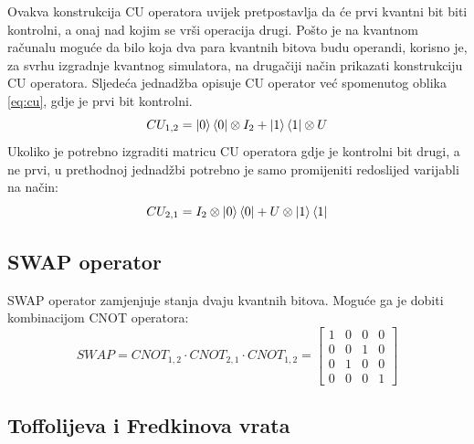 Ovakva konstrukcija CU operatora uvijek pretpostavlja da će prvi kvantni bit biti kontrolni, a onaj nad kojim se vrši operacija drugi. Pošto je na kvantnom računalu moguće da bilo koja dva para kvantnih bitova budu operandi, korisno je, za svrhu izgradnje kvantnog simulatora, na drugačiji način prikazati konstrukciju CU operatora. Sljedeća jednadžba opisuje CU operator već spomenutog oblika \ref{eq:cu}, gdje je prvi bit kontrolni.
\begin{equation}
CU_{1,2} = \ket{0}\bra{0} \otimes I_2 + \ket{1}\bra{1} \otimes U
\end{equation}
Ukoliko je potrebno izgraditi matricu CU operatora gdje je kontrolni bit drugi, a ne prvi, u prethodnoj jednadžbi potrebno je samo promijeniti redoslijed varijabli na način:
\begin{equation}
CU_{2,1} = I_2  \otimes \ket{0}\bra{0} + U \otimes \ket{1}\bra{1}
\end{equation}


\subsection{SWAP operator}

SWAP operator zamjenjuje stanja dvaju kvantnih bitova. Moguće ga je dobiti kombinacijom CNOT operatora:
\begin{equation}
\textit{SWAP} = CNOT_{1,2}\cdot CNOT_{2,1}\cdot CNOT_{1,2} = \begin{bmatrix}
1 & 0 & 0 & 0 \\ 0 & 0 & 1 & 0 \\ 0 & 1 & 0 & 0 \\ 0 & 0 & 0 & 1
\end{bmatrix}
\end{equation}

\subsection{Toffolijeva i Fredkinova vrata}

